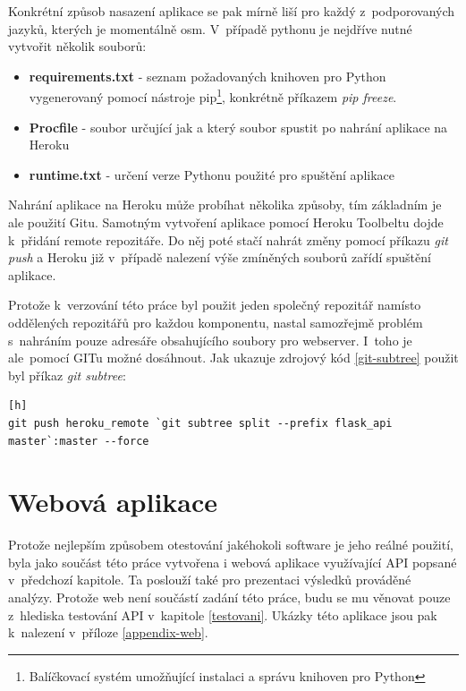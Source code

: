 \documentclass[thesis=B,czech]{FITthesis}[2012/06/26]
\begin{document}
Konkrétní způsob nasazení aplikace se pak mírně liší pro každý z~podporovaných jazyků, kterých je momentálně osm. V~případě pythonu je nejdříve nutné vytvořit několik souborů:

\begin{itemize}
\item \textbf{requirements.txt} - seznam požadovaných knihoven pro Python vygenerovaný pomocí nástroje pip\footnote{Balíčkovací systém umožňující instalaci a správu knihoven pro Python}, konkrétně příkazem \textit{pip freeze}.
\item \textbf{Procfile} - soubor určující jak a který soubor spustit po nahrání aplikace na Heroku
\item \textbf{runtime.txt} - určení verze Pythonu použité pro spuštění aplikace
\end{itemize}

Nahrání aplikace na Heroku může probíhat několika způsoby, tím základním je ale použití Gitu. Samotným vytvoření aplikace pomocí Heroku Toolbeltu dojde k~přidání remote repozitáře. Do něj poté stačí nahrát změny pomocí příkazu \textit{git push} a Heroku již v~případě nalezení výše zmíněných souborů zařídí spuštění aplikace. 

Protože k~verzování této práce byl použit jeden společný repozitář namísto oddělených repozitářů pro každou komponentu, nastal samozřejmě problém s~nahráním pouze adresáře obsahujícího soubory pro webserver. I~toho je ale~pomocí GITu možné dosáhnout. Jak ukazuje zdrojový kód \ref{git-subtree} použit byl příkaz \textit{git subtree}:


\begin{lstlisting}[caption={Příkaz pro nahrání podadresáře na Heroku},label=git-subtree][h]
git push heroku_remote `git subtree split --prefix flask_api master`:master --force
\end{lstlisting}



\section{Webová aplikace}
	Protože nejlepším způsobem otestování jakéhokoli software je jeho reálné použití, byla jako součást této práce vytvořena i webová aplikace využívající API popsané v~předchozí kapitole. Ta poslouží také pro prezentaci výsledků prováděné analýzy. Protože web není součástí zadání této práce, budu se mu věnovat pouze z~hlediska testování API v~kapitole \ref{testovani}. Ukázky této aplikace jsou pak k~nalezení v~příloze \ref{appendix-web}.  
	
\end{document}
